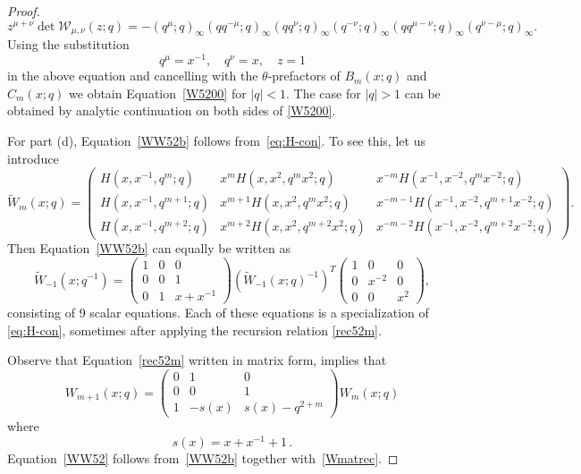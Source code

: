 \documentclass[12pt,reqno]{amsart}
\theoremstyle{definition}
\def\wt{\widetilde}
\def\cW{\mathcal{W}}
\begin{document}
\begin{proof}
\begin{equation}
    \label{zcw52}
    z^{\mu+\nu} \det \cW_{\mu,\nu}(z;q) =
    -(q^\mu;q)_\infty(q q^{-\mu};q)_\infty
    (q q^\nu;q)_\infty(q^{-\nu};q)_\infty
    (q q^{\mu-\nu};q)_\infty (q^{\nu-\mu};q)_\infty.
  \end{equation}
  Using the substitution
  \begin{equation}
    q^\mu = x^{-1},\quad q^{\nu} = x,\quad z =1
  \end{equation}
  in the above equation and cancelling with the $\theta$-prefactors of
  $B_m(x;q)$ and $C_m(x;q)$ we obtain Equation~\eqref{W5200} for
  $|q|<1$.  The case for $|q|>1$ can be obtained by 
  analytic continuation on both sides of \eqref{W5200}.

  For part (d), Equation~\eqref{WW52b} follows from~\eqref{eq:H-con}.
  To see this, let us introduce
  \begin{equation}
    \wt{W}_{m}(x;q) =
    \begin{pmatrix}
      H(x,x^{-1},q^m;q)&x^mH(x,x^2,q^mx^2;q)&x^{-m}H(x^{-1},x^{-2},q^m
      x^{-2};q)\\
      H(x,x^{-1},q^{m+1};q)
      &x^{m+1}H(x,x^2,q^mx^2;q)&x^{-m-1}H(x^{-1},x^{-2},q^{m+1}
      x^{-2};q)\\
      H(x,x^{-1},q^{m+2};q)
      &x^{m+2}H(x,x^2,q^{m+2}x^2;q)&x^{-m-2}H(x^{-1},x^{-2},q^{m+2}
      x^{-2};q)
    \end{pmatrix}.
  \end{equation}
  Then Equation~\eqref{WW52b} can equally be written as
  \begin{equation}
    \wt{W}_{-1}(x;q^{-1}) =
    \begin{pmatrix}
      1&0&0\\
      0&0&1\\
      0&1&x+x^{-1}
    \end{pmatrix}\left(\wt{W}_{-1}(x;q)^{-1}\right)^T
    \begin{pmatrix}
      1&0&0\\0&x^{-2}&0\\0&0&x^2
    \end{pmatrix},
    \label{eq:tW52-id}
  \end{equation}
  consisting of 9 scalar equations.  Each of these equations is a
  specialization of \eqref{eq:H-con}, sometimes after applying the
  recursion relation \eqref{rec52m}.
  
  Observe that Equation~\eqref{rec52m} written in matrix form,
  implies that
  \begin{equation}
    \label{Wmatrec}
    W_{m+1}(x;q) =
    \begin{pmatrix}
      0&1&0\\0&0&1\\1&-s(x)&s(x)-q^{2+m}
    \end{pmatrix} W_m(x;q) 
  \end{equation}
  where 
  \begin{equation}
    \label{sx}
    s(x) = x+x^{-1}+1 \,.
  \end{equation}
  Equation~\eqref{WW52} follows from~\eqref{WW52b} together
  with~\eqref{Wmatrec}.


\end{proof}
\end{document}
